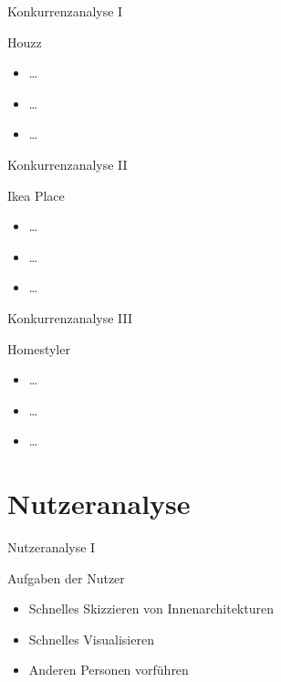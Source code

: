 \documentclass[presentation,bigger,aspectratio=169]{beamer}
\begin{document}
\begin{frame}[label={sec:orgeaf7846}]{Konkurrenzanalyse I}
\begin{block}{Houzz}
\begin{itemize}
\item \ldots{}
\item \ldots{}
\item \ldots{}
\end{itemize}
\end{block}
\end{frame}
\begin{frame}[label={sec:org4668e19}]{Konkurrenzanalyse II}
\begin{block}{Ikea Place}
\begin{itemize}
\item \ldots{}
\item \ldots{}
\item \ldots{}
\end{itemize}
\end{block}
\end{frame}
\begin{frame}[label={sec:org0f74d65}]{Konkurrenzanalyse III}
\begin{block}{Homestyler}
\begin{itemize}
\item \ldots{}
\item \ldots{}
\item \ldots{}
\end{itemize}
\end{block}
\end{frame}
\section{Nutzeranalyse}
\label{sec:org2a16f16}
\begin{frame}[label={sec:org92db75e}]{\vspace{2.2cm}\begin{center}\MakeUppercase{\insertsection}\end{center}}
\end{frame}

\begin{frame}[label={sec:org793c28d}]{Nutzeranalyse I}
\begin{block}{Aufgaben der Nutzer}
\begin{itemize}
\item Schnelles Skizzieren von Innenarchitekturen
\item Schnelles Visualisieren
\item Anderen Personen vorführen
\end{itemize}
\end{block}
\end{frame}
\end{document}
